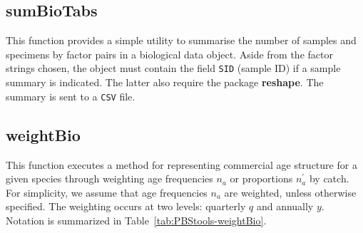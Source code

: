\documentclass[letterpaper,12pt,fleqn]{article}
\def\tab{\hspace{0.5 in}}
\newcommand{\code}[1]{\small\texttt{#1}\normalsize}
\newcommand{\pkg}[1]{{\bf #1}}
\begin{document}
\subsection {sumBioTabs}

\tab This function provides a simple utility to summarise the number of samples and specimens by factor pairs in a biological data object. Aside from the factor strings chosen, the object must contain the field \code{SID} (sample ID) if a sample summary is indicated. The latter also require the package \pkg{reshape}. The summary is sent to a \code{CSV} file.

\subsection {weightBio}

\tab This function executes a method for representing commercial age structure for a given species through weighting age frequencies $n_a$ or proportions $n^\prime_a$ by catch. For simplicity, we assume that age frequencies $n_a$ are weighted, unless otherwise specified. The weighting occurs at two levels: quarterly $q$ and annually $y$. Notation is summarized in Table~\ref{tab:PBStools-weightBio}.
\end{document}
